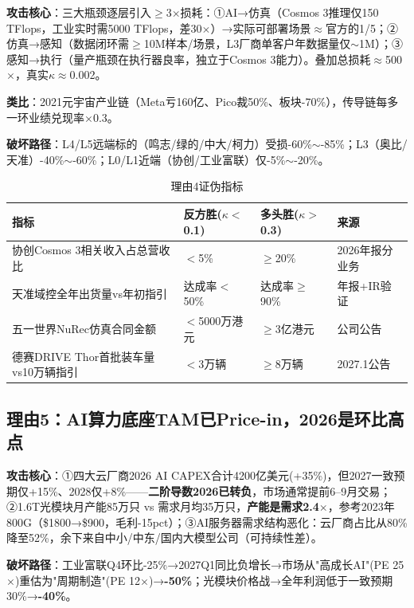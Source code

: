 \textbf{攻击核心}：三大瓶颈逐层引入$\geq$3$\times$损耗：①AI→仿真（Cosmos 3推理仅150 TFlops，工业实时需5000 TFlops，差30$\times$）→实际可部署场景$\approx$官方的1/5；②仿真→感知（数据闭环需$\geq$10M样本/场景，L3厂商单客户年数据量仅$\sim$1M）；③感知→执行（量产瓶颈在执行器良率，独立于Cosmos 3能力）。叠加总损耗$\approx$500$\times$，真实$\kappa\approx$0.002。

\textbf{类比}：2021元宇宙产业链（Meta亏160亿、Pico裁50\%、板块-70\%），传导链每多一环业绩兑现率$\times$0.3。

\textbf{破坏路径}：L4/L5远端标的（鸣志/绿的/中大/柯力）受损-60\%$\sim$-85\%；L3（奥比/天准）-40\%$\sim$-60\%；L0/L1近端（协创/工业富联）仅-5\%$\sim$-20\%。

\begin{table}[H]
\centering\scriptsize
\renewcommand{\arraystretch}{1.1}
\begin{tabularx}{\textwidth}{l X X l}
\toprule
\textbf{指标} & \textbf{反方胜($\kappa<$0.1)} & \textbf{多头胜($\kappa>$0.3)} & \textbf{来源} \\
\midrule
协创Cosmos 3相关收入占总营收比 & $<$5\% & $\geq$20\% & 2026年报分业务 \\
天准域控全年出货量vs年初指引 & 达成率$<$50\% & 达成率$\geq$90\% & 年报+IR验证 \\
五一世界NuRec仿真合同金额 & $<$5000万港元 & $\geq$3亿港元 & 公司公告 \\
德赛DRIVE Thor首批装车量vs10万辆指引 & $<$3万辆 & $\geq$8万辆 & 2027.1公告 \\
\bottomrule
\end{tabularx}
\caption{理由4证伪指标}
\end{table}

\subsection{理由5：AI算力底座TAM已Price-in，2026是环比高点}

\textbf{攻击核心}：①四大云厂商2026 AI CAPEX合计4200亿美元(+35\%)，但2027一致预期仅+15\%、2028仅+8\%——\textbf{二阶导数2026已转负}，市场通常提前6--9月交易；②1.6T光模块月产能85万只 vs 需求月均35万只，\textbf{产能是需求2.4$\times$}，参考2023年800G（\$1800→\$900，毛利-15pct）；③AI服务器需求结构恶化：云厂商占比从80\%降至52\%，余下来自中小/中东/国内大模型公司（可持续性差）。

\textbf{破坏路径}：工业富联Q4环比-25\%→2027Q1同比负增长→市场从"高成长AI"(PE 25$\times$)重估为"周期制造"(PE 12$\times$)→\textbf{-50\%}；光模块价格战→全年利润低于一致预期30\%→\textbf{-40\%}。

